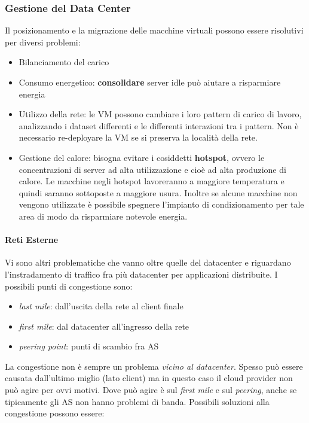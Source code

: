 \documentclass{article}
\begin{document}
		\subsubsection{Gestione del Data Center}\label{gestione-del-data-center}
		
		Il posizionamento e la migrazione delle macchine virtuali possono essere risolutivi per diversi problemi:
		
		\begin{itemize}
		\item
		  Bilanciamento del carico
		\item
		  Consumo energetico: \textbf{consolidare} server idle può aiutare a risparmiare energia
		\item
		  Utilizzo della rete: le VM possono cambiare i loro pattern di carico di lavoro, analizzando i dataset differenti e le differenti interazioni tra i pattern. Non è necessario re-deployare la VM se si preserva la località della rete.
		\item
		  Gestione del calore: bisogna evitare i cosiddetti \textbf{hotspot}, ovvero le concentrazioni di server ad alta utilizzazione e cioè ad alta produzione di calore. Le macchine negli hotspot lavoreranno a maggiore temperatura e quindi saranno sottoposte a maggiore usura. Inoltre se alcune macchine non vengono utilizzate è possibile spegnere l'impianto di condizionamento per tale area di modo da risparmiare notevole energia.
		\end{itemize}
		
		\paragraph{Reti Esterne}
		Vi sono altri problematiche che vanno oltre quelle del datacenter e riguardano l’instradamento di traffico fra più datacenter per applicazioni distribuite.
		I possibili punti di congestione sono:
		\begin{itemize}
			\item \textit{last mile}: dall'uscita della rete al client finale
			\item \textit{first mile}: dal datacenter all'ingresso della rete
			\item \textit{peering point}: punti di scambio fra AS
		\end{itemize}
		La congestione non è sempre un problema \emph{vicino al
		datacenter}. Spesso può essere causata dall'ultimo miglio (lato
		client) ma in questo caso il cloud provider non può agire per ovvi motivi. Dove può agire è sul \textit{first mile} e sul \textit{peering}, anche se tipicamente gli AS non hanno problemi di banda. Possibili
		soluzioni alla congestione possono essere:
		
\end{document}
